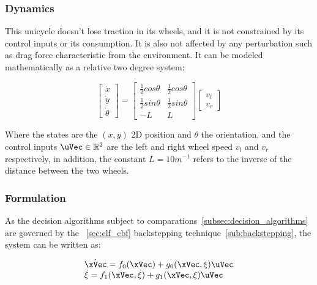 \subsubsection{Dynamics}
\label{subsec:unicycle_dynamics}

This unicycle doesn't lose traction in its wheels, and it is not constrained by its control inputs or its consumption. It is also not affected by any perturbation such as drag force characteristic from the environment. It can be modeled mathematically as a relative two degree system:

\begin{equation}
    \begin{bmatrix} \dot{x} \\ \dot{y} \\ \dot{\theta} \end{bmatrix} = \begin{bmatrix} \frac{1}{2}cos \theta & \frac{1}{2}cos \theta \\  \frac{1}{2}sin \theta & \frac{1}{2}sin \theta \\ -L & L  \end{bmatrix} \begin{bmatrix} v_l \\ v_r\end{bmatrix}
    \label{eq:unicycle_model}
\end{equation}


Where the states are the \((x,y)\) 2D position and \(\theta\) the orientation, and the control inputs \(\uVec \in \mathbb{R}^2\) are the left and right wheel speed \(v_l\) and \(v_r\) respectively, in addition, the constant \(L = 10 m^{-1}\) refers to the inverse of the distance between the two wheels. 

\subsubsection{ Formulation}
\label{subsubsec:Unicyle_CLF-CBF_Experiment_Setup}

As the decision algorithms subject to comparations~\ref{subsec:decision_algorithms} are governed by the ~\ref{sec:clf_cbf} backstepping technique~\ref{sub:backstepping}, the system can be written as:


\begin{equation}
    \begin{array}{l}
        \dot{\xVec} = f_0(\xVec) +  g_0(\xVec, \xi)\uVec \\
        \dot{\xi} = f_1(\xVec, \xi) + g_1(\xVec, \xi)\uVec
    \end{array}
    \label{eq:second_order_unicycle_model_backstepp}
\end{equation}

